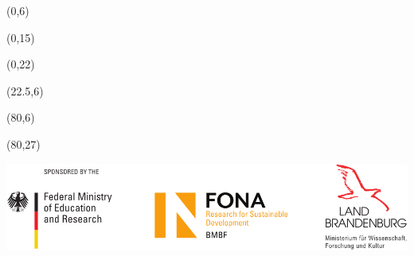 \documentclass[28pt]{beamer}
\begin{document}
    \begin{frame}

        \begin{textblock}{20}(0,6)
            
        \end{textblock}

        \begin{textblock}{20}(0,15)
            
        \end{textblock}

        \begin{textblock}{20}(0,22)
            
        \end{textblock}

        \begin{textblock}{55}(22.5,6)
            
        \end{textblock}

        \begin{textblock}{20}(80,6)
            
        \end{textblock}


%
        \begin{textblock}{20}(80,27)
            \begin{WhiteBox}
                \vspace{-1cm}
                \begin{block}{}
                    \includegraphics[width=\textwidth]{img/Sponsor_logos}
                \end{block}
            \end{WhiteBox}
        \end{textblock}
    \end{frame}
\end{document}
